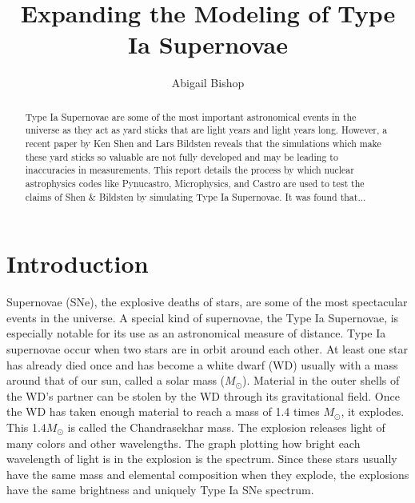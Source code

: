 \documentclass[11pt, oneside]{article}   	%
\title{Expanding the Modeling of Type Ia Supernovae}
\author{Abigail Bishop}
\begin{document}
\maketitle

\begin{abstract}

  Type Ia Supernovae are some of the most important astronomical events in the universe as they act as yard sticks that are light years and light years long. However, a recent paper by Ken Shen and Lars Bildsten reveals that the simulations which make these yard sticks so valuable are not fully developed and may be leading to inaccuracies in measurements. This report details the process by which nuclear astrophysics codes like Pynucastro, Microphysics, and Castro are used to test the claims of Shen \& Bildsten by simulating Type Ia Supernovae. It was found that... %
  
  
\end{abstract}


\section{Introduction}

  
  
  
  Supernovae (SNe), the explosive deaths of stars, are some of the most spectacular events in the universe. A special kind of supernovae, the Type Ia Supernovae, is especially notable for its use as an astronomical measure of distance. Type Ia supernovae occur when two stars are in orbit around each other. At least one star has already died once and has become a white dwarf (WD) usually with a mass around that of our sun, called a solar mass ($M_{\odot}$). Material in the outer shells of the WD's partner can be stolen by the WD through its gravitational field. Once the WD has taken enough material to reach a mass of 1.4 times $M_{\odot}$, it explodes. This 1.4$M_{\odot}$ is called the Chandrasekhar mass. The explosion releases light of many colors and other wavelengths. The graph plotting how bright each wavelength of light is in the explosion is the spectrum. Since these stars usually have the same mass and elemental composition when they explode, the explosions have the same brightness and uniquely Type Ia SNe spectrum. 
  
\end{document}
